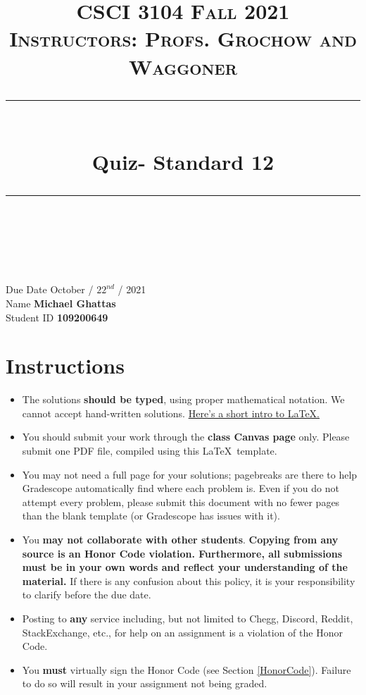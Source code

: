 \documentclass[11pt]{article}
\title{
\normalfont \normalsize 
\textsc{CSCI 3104 Fall 2021 \\ 
Instructors: Profs. Grochow and Waggoner} \\
[10pt] 
\rule{\linewidth}{0.5pt} \\[6pt] 
\huge Quiz- Standard 12 \\
\rule{\linewidth}{2pt}  \\[10pt]
}
\date{}
\theoremstyle{definition}
\theoremstyle{definition}
\theoremstyle{definition}
\begin{document}

\maketitle


\noindent
Due Date \dotfill October / $22^{nd}$ / 2021 \\
Name \dotfill \textbf{Michael Ghattas} \\
Student ID \dotfill \textbf{109200649} \\


\tableofcontents

\section{Instructions}
 \begin{itemize}
	\item The solutions \textbf{should be typed}, using proper mathematical notation. We cannot accept hand-written solutions. \href{http://ece.uprm.edu/~caceros/latex/introduction.pdf}{Here's a short intro to \LaTeX.}
	\item You should submit your work through the \textbf{class Canvas page} only. Please submit one PDF file, compiled using this \LaTeX \ template.
	\item You may not need a full page for your solutions; pagebreaks are there to help Gradescope automatically find where each problem is. Even if you do not attempt every problem, please submit this document with no fewer pages than the blank template (or Gradescope has issues with it).

	\item You \textbf{may not collaborate with other students}. \textbf{Copying from any source is an Honor Code violation. Furthermore, all submissions must be in your own words and reflect your understanding of the material.} If there is any confusion about this policy, it is your responsibility to clarify before the due date. 

	\item Posting to \textbf{any} service including, but not limited to Chegg, Discord, Reddit, StackExchange, etc., for help on an assignment is a violation of the Honor Code.

	\item You \textbf{must} virtually sign the Honor Code (see Section \ref{HonorCode}). Failure to do so will result in your assignment not being graded.
\end{itemize}
\end{document}
